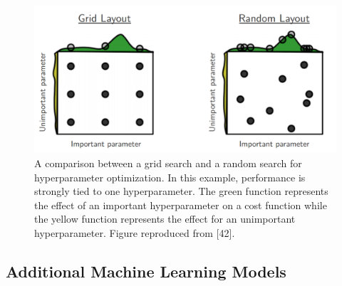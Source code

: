 \begin{figure}[H]
	\centering
	\includegraphics[width=0.99\linewidth]{images/Bergstra12a_hyperparameter_grid_vs_random}
	\caption{A comparison between a grid search and a random search for hyperparameter optimization. In this example, performance is strongly tied to one hyperparameter. The green function represents the effect of an important hyperparameter on a cost function while the yellow function represents the effect for an unimportant hyperparameter. Figure reproduced from [42].}
	\label{fig:Bergstra12a_hyperparameter_grid_vs_random}
\end{figure}






\subsection{Additional Machine Learning Models}

